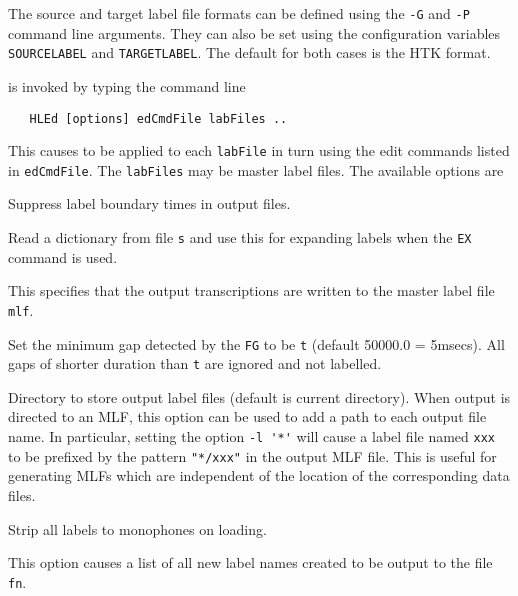 The source and target label file formats can be 
defined using the \texttt{-G} and \texttt{-P} command line arguments.  They can
also be set using the configuration variables \texttt{SOURCELABEL} 
and \texttt{TARGETLABEL}.  The default for both cases is the HTK format.


 is invoked by typing the command line
\begin{verbatim}
   HLEd [options] edCmdFile labFiles ..
\end{verbatim}
This causes  to be applied to each \texttt{labFile} in turn
using the edit commands listed in \texttt{edCmdFile}.  The 
\texttt{labFiles} may be master label files.
The available options are

\begin{optlist}

   Suppress label boundary times in output files.

   Read a dictionary from file {\tt s} and use this
  for expanding labels when the {\tt EX} command is used.

   This specifies that the output transcriptions
  are written to the master label file \texttt{mlf}.

   Set the minimum gap detected by the \texttt{FG} to be \texttt{t}
      (default 50000.0 = 5msecs).
     All gaps of shorter duration than \texttt{t} are ignored and not labelled.
  
   Directory to store output label files (default is current directory).
      When output is directed to an MLF,  this option can be used to
      add a path to each output file name.  In particular, setting the option
      \verb+-l '*'+ will cause a label file named \texttt{xxx} to be prefixed
      by the pattern \verb+"*/xxx"+ in the output MLF file.  This is useful
      for generating MLFs which are independent of the location of the 
      corresponding data files.

   Strip all labels to monophones on loading.
 
   This option causes a list of all new label names
      created to be output to the file \texttt{fn}.

\stdoptG
\stdoptI
\stdoptP
\stdoptX

\end{optlist}


